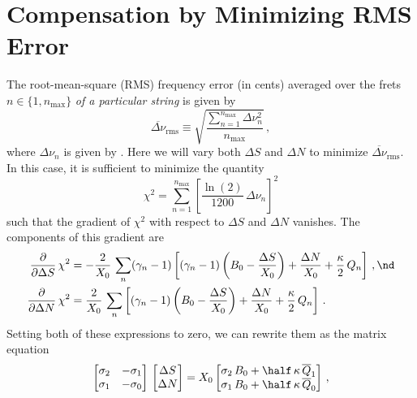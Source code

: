 %
%
%

 \section{Compensation by Minimizing RMS Error\label{app:rms}}

The root-mean-square (RMS) frequency error (in cents) averaged over the frets $n \in \{1, n_\text{max}\}$ \emph{of a particular string} is given by
 \begin{equation}\label{eqn:rms_def}
\overline{\Delta \nu}_\text{rms} \equiv \sqrt{\frac{\sum_{n = 1}^{n_\text{max}} \Delta \nu_n^2}{n_\text{max}}}\, ,
 \end{equation}
where $\Delta \nu_n$ is given by . Here we will vary both $\Delta S$ and $\Delta N$ to minimize $\overline{\Delta \nu}_\text{rms}$. In this case, it is sufficient to minimize the quantity
 \begin{equation}\label{eqn:chi2_def}
\chi^2 = \sum_{n = 1}^{n_\text{max}} \left[\frac{\ln(2)}{1200}\, \Delta \nu_n\right]^2
 \end{equation}
such that the gradient of $\chi^2$ with respect to $\Delta S$ and $\Delta N$ vanishes. The components of this gradient are
 \begin{subequations}\label{chi2_grad}
 \begin{align}
\frac{\partial}{\partial \Delta S}\, \chi^2 &= -\frac{2}{X_0}\, \sum_n (\gamma_n - 1)\left[ (\gamma_n - 1) \left(B_0 - \frac{\Delta S}{X_0}\right) + \frac{\Delta N}{X_0} + \frac{\kappa}{2}\, Q_n \right]\, , \nd \\
\frac{\partial}{\partial \Delta N}\, \chi^2 &= \frac{2}{X_0}\, \sum_n \left[ (\gamma_n - 1) \left(B_0 - \frac{\Delta S}{X_0}\right) + \frac{\Delta N}{X_0} + \frac{\kappa}{2}\, Q_n \right]\, .
 \end{align}
 \end{subequations}
Setting both of these expressions to zero, we can rewrite them as the matrix equation
 \begin{equation} \label{eqn:rms_mat}
\begin{bmatrix}
  \sigma_2 & -\sigma_1 \\
  \sigma_1 & -\sigma_0
\end{bmatrix}\,
\begin{bmatrix}
  \Delta S \\
  \Delta N
\end{bmatrix} = X_0
\begin{bmatrix}
  \sigma_2\, B_0 +  \half\, \kappa\, \overline{Q}_1 \\
  \sigma_1\, B_0 +  \half\, \kappa\, \overline{Q}_0
\end{bmatrix}\, ,
 \end{equation}
